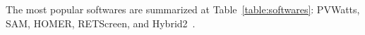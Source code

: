 The most popular softwares are summarized at Table~\ref{table:softwares}: PVWatts, SAM, HOMER, RETScreen, and Hybrid2~\cite{Pradhan,Swarnkar,NRELDobos,NRELBlair,Mills}.
%
